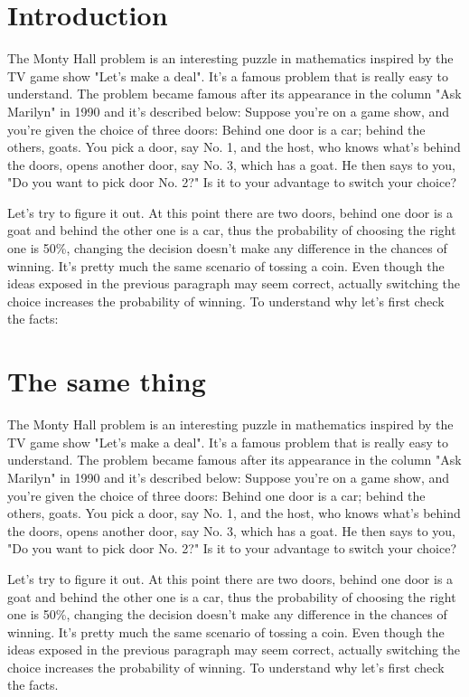 \documentclass[preprint]{oscmjournal}
\begin{document}
\section{Introduction}

The Monty Hall problem is an interesting puzzle in mathematics inspired by the TV  game show "Let's make a deal". It's a famous problem that is really easy to understand. The problem became famous after its appearance in the column "Ask Marilyn" in 1990 and  it's described below: Suppose you're on a game show, and you're given the choice of three doors: Behind one  door is a car; behind the others, goats. You pick a door, say No. 1, and the host, who  knows what's behind the doors, opens another door, say No. 3, which has a goat. He then  says to you, "Do you want to pick door No. 2?" Is it to your advantage to switch your choice?


Let's try to figure it out. At this point there are two doors, behind one door is a goat  and behind the other one is a car, thus the probability of choosing the right one is 50\%, changing the decision doesn't make any difference in the chances of winning. It's pretty much the same scenario of tossing a coin. Even though the ideas exposed in the previous paragraph may seem correct, actually switching the choice increases the probability of winning. To understand why let's  first check the facts:

\section{The same thing}

The Monty Hall problem is an interesting puzzle in mathematics inspired by the TV  game show "Let's make a deal". It's a famous problem that is really easy to understand. The problem became famous after its appearance in the column "Ask Marilyn" in 1990 and  it's described below: Suppose you're on a game show, and you're given the choice of three doors: Behind one  door is a car; behind the others, goats. You pick a door, say No. 1, and the host, who  knows what's behind the doors, opens another door, say No. 3, which has a goat. He then  says to you, "Do you want to pick door No. 2?" Is it to your advantage to switch your choice?

Let's try to figure it out. At this point there are two doors, behind one door is a goat  and behind the other one is a car, thus the probability of choosing the right one is 50\%, changing the decision doesn't make any difference in the chances of winning. It's pretty much the same scenario of tossing a coin. Even though the ideas exposed in the previous paragraph may seem correct, actually switching the choice increases the probability of winning. To understand why let's  first check the facts.
\end{document}
